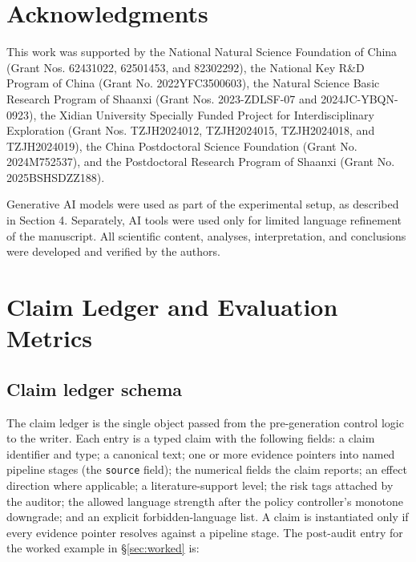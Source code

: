 \documentclass[10pt,twocolumn]{article}
\begin{document}
\section*{Acknowledgments}

This work was supported by the National Natural Science Foundation of China (Grant Nos. 62431022, 62501453, and 82302292), the National Key R\&D Program of China (Grant No. 2022YFC3500603), the Natural Science Basic Research Program of Shaanxi (Grant Nos. 2023-ZDLSF-07 and 2024JC-YBQN-0923), the Xidian University Specially Funded Project for Interdisciplinary Exploration (Grant Nos. TZJH2024012, TZJH2024015, TZJH2024018, and TZJH2024019), the China Postdoctoral Science Foundation (Grant No. 2024M752537), and the Postdoctoral Research Program of Shaanxi (Grant No. 2025BSHSDZZ188).

Generative AI models were used as part of the experimental setup, as described in Section 4. Separately, AI tools were used only for limited language refinement of the manuscript. All scientific content, analyses, interpretation, and conclusions were developed and verified by the authors.


\appendix
\setcounter{table}{0}
\setcounter{figure}{0}
\renewcommand{\thetable}{A\arabic{table}}
\renewcommand{\thefigure}{A\arabic{figure}}

\section{Claim Ledger and Evaluation Metrics}
\label{app:audit-details}

\subsection{Claim ledger schema}
\label{app:ledger}

The claim ledger is the single object passed from the pre-generation control logic to the writer. Each entry is a typed claim with the following fields: a claim identifier and type; a canonical text; one or more evidence pointers into named pipeline stages (the \texttt{source} field); the numerical fields the claim reports; an effect direction where applicable; a literature-support level; the risk tags attached by the auditor; the allowed language strength after the policy controller's monotone downgrade; and an explicit forbidden-language list. A claim is instantiated only if every evidence pointer resolves against a pipeline stage. The post-audit entry for the worked example in \S\ref{sec:worked} is:
\end{document}
